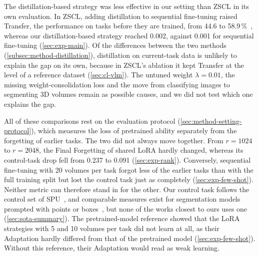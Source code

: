 The distillation-based strategy was less effective in our setting than ZSCL in its own evaluation.
In ZSCL, adding distillation to sequential fine-tuning raised Transfer, the performance on tasks before they are trained, from 44.6 to 58.9\,\%~\cite[Table~2]{zheng2023preventingzeroshottransferdegradation}, whereas our distillation-based strategy reached 0.002, against 0.001 for sequential fine-tuning (\cref{sec:exp-main}).
Of the differences between the two methods (\cref{subsec:method-distillation}), distillation on current-task data is unlikely to explain the gap on its own, because in ZSCL's ablation it kept Transfer at the level of a reference dataset (\cref{sec:cl-vlm}).
The untuned weight $\lambda = 0.01$, the missing weight-consolidation loss and the move from classifying images to segmenting 3D volumes remain as possible causes, and we did not test which one explains the gap.

All of these comparisons rest on the evaluation protocol (\cref{sec:method-setting-protocol}), which measures the loss of pretrained ability separately from the forgetting of earlier tasks.
The two did not always move together.
From $r = 1024$ to $r = 2048$, the Final Forgetting of shared LoRA hardly changed, whereas its control-task drop fell from 0.237 to 0.091 (\cref{sec:exp-rank}).
Conversely, sequential fine-tuning with 20 volumes per task forgot less of the earlier tasks than with the full training split but lost the control task just as completely (\cref{sec:exp-few-shot}).
Neither metric can therefore stand in for the other.
Our control task follows the control set of SPU~\cite{Zhang_2024_CVPR}, and comparable measures exist for segmentation models prompted with points or boxes~\cite{wang2025casam,wang2024sammed3dmoe}, but none of the works closest to ours uses one (\cref{sec:sota-summary}).
The pretrained-model reference showed that the LoRA strategies with 5 and 10 volumes per task did not learn at all, as their Adaptation hardly differed from that of the pretrained model (\cref{sec:exp-few-shot}).
Without this reference, their Adaptation would read as weak learning.

